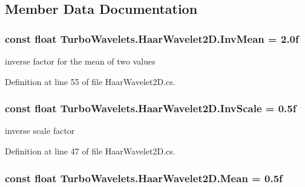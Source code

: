 \subsection{\-Member \-Data \-Documentation}
\hypertarget{class_turbo_wavelets_1_1_haar_wavelet2_d_aea88909dad98e2812d5b065da35ec361}{
\subsubsection[{\-Inv\-Mean}]{\setlength{\rightskip}{0pt plus 5cm}const float {\bf \-Turbo\-Wavelets.\-Haar\-Wavelet2\-D.\-Inv\-Mean} = 2.\-0f}}\label{class_turbo_wavelets_1_1_haar_wavelet2_d_aea88909dad98e2812d5b065da35ec361}


inverse factor for the mean of two values 



\-Definition at line 55 of file \-Haar\-Wavelet2\-D.\-cs.

\hypertarget{class_turbo_wavelets_1_1_haar_wavelet2_d_ab2fa94eb968bd48292856758c241b186}{
\subsubsection[{\-Inv\-Scale}]{\setlength{\rightskip}{0pt plus 5cm}const float {\bf \-Turbo\-Wavelets.\-Haar\-Wavelet2\-D.\-Inv\-Scale} = 0.\-5f}}\label{class_turbo_wavelets_1_1_haar_wavelet2_d_ab2fa94eb968bd48292856758c241b186}


inverse scale factor 



\-Definition at line 47 of file \-Haar\-Wavelet2\-D.\-cs.

\hypertarget{class_turbo_wavelets_1_1_haar_wavelet2_d_ae874d9a5f34ead2fbf4dc8efc4fc3e70}{
\subsubsection[{\-Mean}]{\setlength{\rightskip}{0pt plus 5cm}const float {\bf \-Turbo\-Wavelets.\-Haar\-Wavelet2\-D.\-Mean} = 0.\-5f}}\label{class_turbo_wavelets_1_1_haar_wavelet2_d_ae874d9a5f34ead2fbf4dc8efc4fc3e70}


